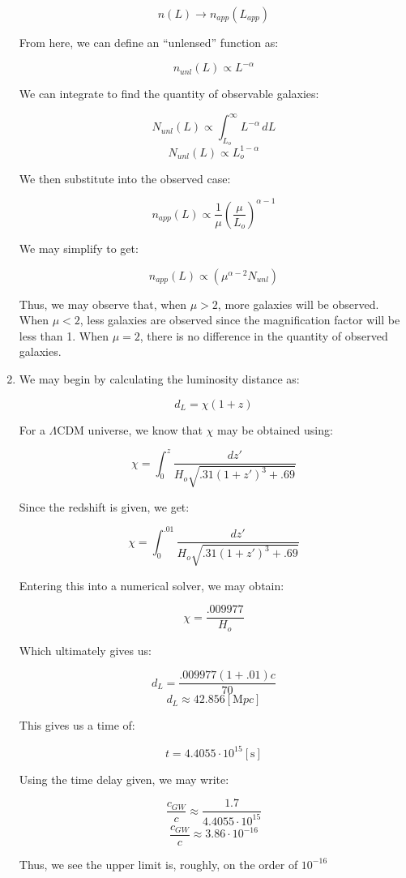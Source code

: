 \begin{enumerate}
    $$n(L)\to n_{app}(L_{app})$$

    From here, we can define an ``unlensed'' function as:

    $$n_{unl}(L)\propto L^{-\alpha}$$

    We can integrate to find the quantity of observable galaxies:

    $$N_{unl}(L)\propto\int_{L_o}^{\infty}L^{-\alpha}\,dL$$
    $$N_{unl}(L)\propto L_o^{1-\alpha}$$

    We then substitute into the observed case:

    $$n_{app}(L)\propto \frac{1}{\mu}\left( \frac{\mu}{L_o} \right)^{\alpha-1}$$

    We may simplify to get:

    $$n_{app}(L)\propto \left( \mu^{\alpha-2}N_{unl} \right)$$

    Thus, we may observe that, when $\mu >2$, more galaxies will be observed. When $\mu<2$, less galaxies are observed since the magnification factor will be less than 1. When $\mu=2$, there is no difference in the quantity of observed galaxies.

  \item We may begin by calculating the luminosity distance as:

    $$d_L=\chi(1+z)$$

    For a $\Lambda$CDM universe, we know that $\chi$ may be obtained using:

    $$\chi=\int_0^z \frac{dz'}{H_o\sqrt{.31(1+z')^3+.69}}$$
    
    Since the redshift is given, we get:

    $$\chi=\int_0^{.01} \frac{dz'}{H_o\sqrt{.31(1+z')^3+.69}}$$

    Entering this into a numerical solver, we may obtain:

    $$\chi=\frac{.009977}{H_o}$$

    Which ultimately gives us:

    $$d_L=\frac{.009977(1+.01)c}{70}$$
    $$\boxed{d_L\approx 42.856[\si{\mega pc}]}$$

    This gives us a time of:

    $$t=4.4055\cdot10^{15}[\si{\second}]$$

    Using the time delay given, we may write:

    $$\frac{c_{GW}}{c}\approx \frac{1.7}{4.4055\cdot10^{15}}$$
    $$\frac{c_{GW}}{c}\approx 3.86\cdot10^{-16}$$

    Thus, we see the upper limit is, roughly, on the order of $10^{-16}$

\end{enumerate}



